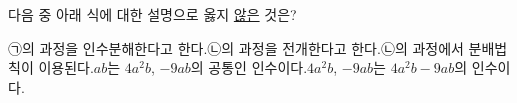 다음 중 아래 식에 대한 설명으로 옳지 \underline{않은} 것은?
\begin{choicesv}{㉠의 과정을 인수분해한다고 한다.}{㉡의 과정을 전개한다고 한다.}{㉡의 과정에서 분배법칙이 이용된다.}{$ab$는 $4a^2b$, $-9ab$의 공통인 인수이다.}{$4a^2b$, $-9ab$는 $4a^2b-9ab$의 인수이다.}\end{choicesv}
